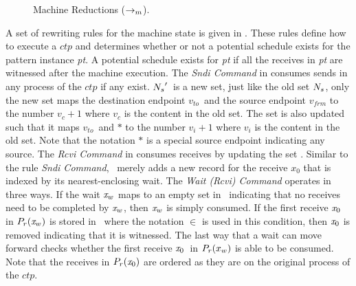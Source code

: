 \begin{figure*}[tb]
{}
\caption{Machine Reductions ($\rightarrow_{m}$). }
\label{fig:machine}
\end{figure*}

A set of rewriting rules for the machine state is given in . These rules define how to execute a $\mathit{ctp}$ and determines whether or not a potential schedule exists for the pattern instance \textit{pt}. A potential schedule exists for \textit{pt} if all the receives in \textit{pt} are witnessed after the machine execution.
The \emph{Sndi Command} in  consumes sends in any process of the $\mathit{ctp}$ if any exist. 
$\textit{$N_s$}^\prime$\ is a new set, just like the old set $\textit{$N_s$}$, only the new set maps the destination
endpoint $v_{to}$\ and the source endpoint $v_{frm}$ to the number $v_c + 1$ where $v_c$ is the content in the old set.
The set is also updated such that it maps $v_{to}$\ and $\ast$ to the number $v_i + 1$ where $v_i$ is the content in the old set. Note that the notation $\ast$ is a special source endpoint indicating any source.
The \emph{Rcvi Command} in  consumes receives by updating the set \epwait. 
Similar to the rule \emph{Sndi Command}, \epwait\ merely adds a new record for the receive $x_0$ that is indexed by its nearest-enclosing wait. 
The \emph{Wait (Rcvi) Command} operates in three ways. 
If the wait $\mathit{x}_w$ maps to an empty set in \epwait\ indicating that no receives need to be completed by $\mathit{x}_w$, then $\mathit{x}_w$ is simply consumed. 
If the first receive $\mathit{x}_0$ in $\textit{$P_r$}(\mathit{x}_w)$ is stored in \rcvp\ where the notation $\in$ is used in this condition, then $\mathit{x}_0$ is removed indicating that it is witnessed. 
The last way that a wait can move forward checks whether the first receive $\mathit{x}_0$\ in $\textit{$P_r$}(x_w)$ is able to be consumed. Note that the receives in $\textit{$P_r$}(\mathit{x}_0)$ are ordered as they are on the original process of the $\mathit{ctp}$. 

